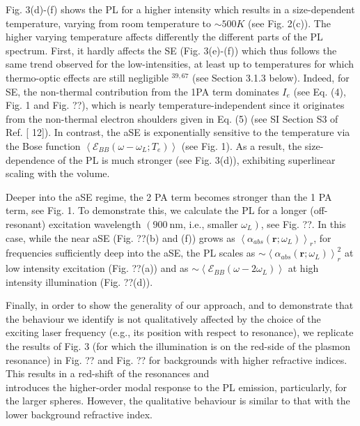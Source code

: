 \documentclass[10pt]{article}
\begin{document}
Fig. 3(d)-(f) shows the PL for a higher intensity which results in a size-dependent temperature, varying from room temperature to $\sim 500 K$ (see Fig. 2(c)). The higher varying temperature affects differently the different parts of the PL spectrum. First, it hardly affects the SE (Fig. 3(e)-(f)) which thus follows the same trend observed for the low-intensities, at least up to temperatures for which thermo-optic effects are still negligible ${ }^{39,67}$ (see Section 3.1.3 below). Indeed, for SE, the non-thermal contribution from the 1PA term dominates $I_{e}$ (see Eq. (4), Fig. 1 and Fig. ??), which is nearly temperature-independent since it originates from the non-thermal electron shoulders given in Eq. (5) (see SI Section S3 of Ref. [ 12]). In contrast, the aSE is exponentially sensitive to the temperature via the Bose function $\left\langle\mathcal{E}_{B B}\left(\omega-\omega_{L} ; T_{e}\right)\right\rangle$ (see Fig. 1). As a result, the size-dependence of the PL is much stronger (see Fig. 3(d)), exhibiting superlinear scaling with the volume.

Deeper into the aSE regime, the 2 PA term becomes stronger than the 1 PA term, see Fig. 1. To demonstrate this, we calculate the PL for a longer (off-resonant) excitation wavelength $\left(900 \mathrm{~nm}\right.$, i.e., smaller $\left.\omega_{L}\right)$, see Fig. ??. In this case, while the near aSE (Fig. ??(b) and (f)) grows as $\left\langle\alpha_{a b s}\left(\mathbf{r} ; \omega_{L}\right)\right\rangle_{r}$, for frequencies sufficiently deep into the aSE, the PL scales as $\sim\left\langle\alpha_{a b s}\left(\mathbf{r} ; \omega_{L}\right)\right\rangle_{r}^{2}$ at low intensity excitation (Fig. ??(a)) and as $\sim\left\langle\mathcal{E}_{B B}\left(\omega-2 \omega_{L}\right)\right\rangle$ at high intensity illumination (Fig. ??(d)).

Finally, in order to show the generality of our approach, and to demonstrate that the behaviour we identify is not qualitatively affected by the choice of the exciting laser frequency (e.g., its position with respect to resonance), we replicate the results of Fig. 3 (for which the illumination is on the red-side of the plasmon resonance) in Fig. ?? and Fig. ?? for backgrounds with higher refractive indices. This results in a red-shift of the resonances and\\
introduces the higher-order modal response to the PL emission, particularly, for the larger spheres. However, the qualitative behaviour is similar to that with the lower background refractive index.
\end{document}
